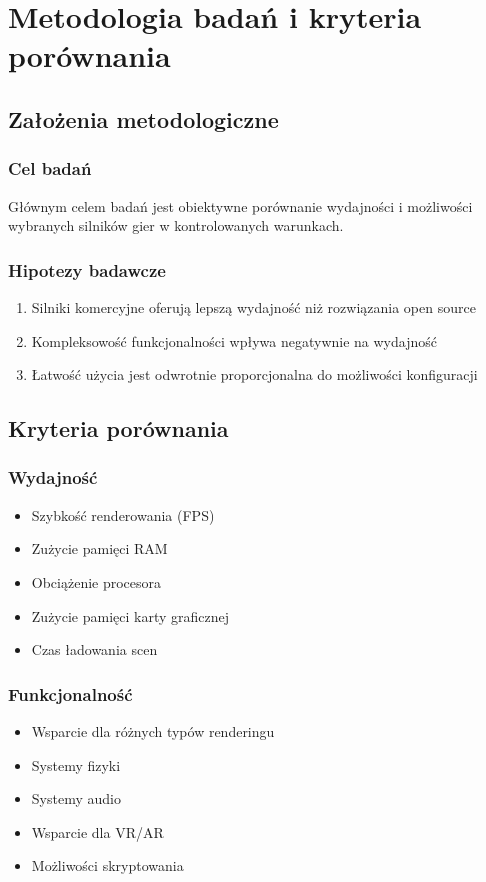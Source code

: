 \clearpage
\section{Metodologia badań i kryteria porównania}

\subsection{Założenia metodologiczne}
\subsubsection{Cel badań}
Głównym celem badań jest obiektywne porównanie wydajności i możliwości wybranych silników gier w kontrolowanych warunkach.

\subsubsection{Hipotezy badawcze}
\begin{enumerate}
    \item Silniki komercyjne oferują lepszą wydajność niż rozwiązania open source
    \item Kompleksowość funkcjonalności wpływa negatywnie na wydajność
    \item Łatwość użycia jest odwrotnie proporcjonalna do możliwości konfiguracji
\end{enumerate}

\subsection{Kryteria porównania}
\subsubsection{Wydajność}
\begin{itemize}
    \item Szybkość renderowania (FPS)
    \item Zużycie pamięci RAM
    \item Obciążenie procesora
    \item Zużycie pamięci karty graficznej
    \item Czas ładowania scen
\end{itemize}

\subsubsection{Funkcjonalność}
\begin{itemize}
    \item Wsparcie dla różnych typów renderingu
    \item Systemy fizyki
    \item Systemy audio
    \item Wsparcie dla VR/AR
    \item Możliwości skryptowania
\end{itemize}

